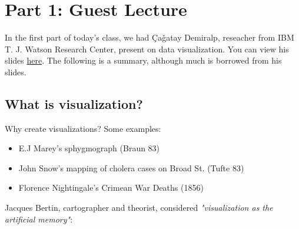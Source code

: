 
\section{Part 1: Guest Lecture}
In the first part of today's class, we had \c{C}a\v{g}atay Demiralp, reseacher from IBM T. J. Watson Research Center, present on data visualization. You can view his slides \href{https://drive.google.com/file/d/0B-M9UEiE6KFAWmtvUjQta0RFNkk/view}{here}. The following is a summary, although much is borrowed from his slides.

\subsection{What is visualization?}
Why create visualizations? Some examples:
\begin{itemize}
	\item E.J Marey's sphygmograph (Braun 83)
	\item John Snow's mapping of cholera cases on Broad St. (Tufte 83)
	\item Florence Nightingale's Crimean War Deaths (1856)
\end{itemize}
Jacques Bertin, cartographer and theorist, considered \emph{"visualization as the artificial memory"}:
